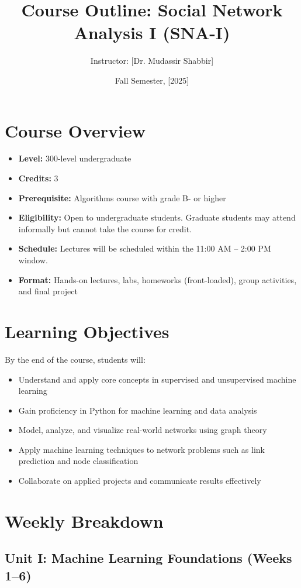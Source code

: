 \documentclass[12pt]{article}
\title{Course Outline: Social Network Analysis I (SNA-I)}
\author{Instructor: [Dr. Mudassir Shabbir]}
\date{Fall Semester, [2025]}
\begin{document}
\maketitle

\section*{Course Overview}
\begin{itemize}[leftmargin=1.5em]
  \item \textbf{Level:} 300-level undergraduate
  \item \textbf{Credits:} 3
  \item \textbf{Prerequisite:} Algorithms course with grade B- or higher
  \item \textbf{Eligibility:} Open to undergraduate students. Graduate students may attend informally but cannot take the course for credit.
  \item \textbf{Schedule:} Lectures will be scheduled within the 11:00 AM -- 2:00 PM window.
  \item \textbf{Format:} Hands-on lectures, labs, homeworks (front-loaded), group activities, and final project
\end{itemize}

\section*{Learning Objectives}
By the end of the course, students will:
\begin{itemize}
  \item Understand and apply core concepts in supervised and unsupervised machine learning
  \item Gain proficiency in Python for machine learning and data analysis
  \item Model, analyze, and visualize real-world networks using graph theory
  \item Apply machine learning techniques to network problems such as link prediction and node classification
  \item Collaborate on applied projects and communicate results effectively
\end{itemize}

\section*{Weekly Breakdown}

\subsection*{Unit I: Machine Learning Foundations (Weeks 1--6)}
\end{document}
